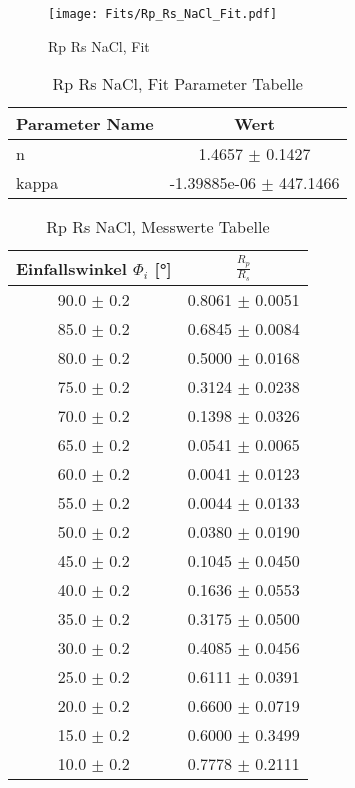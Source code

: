 \begin{figure}[ht] 
 	\centering 
 	\texttt{[image: Fits/Rp\_Rs\_NaCl\_Fit.pdf]} 
	\caption{Rp Rs NaCl, Fit} 
 	\label{fig:Rp Rs NaCl, Fit} 
\end{figure}
 
\begin{table}[ht] 
	\centering 
	\caption{Rp Rs NaCl, Fit Parameter Tabelle} 
	\label{tab: Rp Rs NaCl, Fit Parameter Tabelle}
	\begin{tabular}{|l|c|}
		\hline
		Parameter Name	&	Wert \\ \hline
		n	&	 1.4657 $\pm$  0.1427\\ \hline
		kappa	&	-1.39885e-06 $\pm$  447.1466\\ \hline
	\end{tabular} 
\end{table}
 
\begin{table}[ht] 
	\centering 
	\caption{Rp Rs NaCl, Messwerte Tabelle} 
	\label{tab: Rp Rs NaCl, Messwerte Tabelle}
	\begin{tabular}{|c|c|}
		\hline
		Einfallswinkel $\Phi_i$ [°] 	&	 $\frac{R_p}{R_s}$\\ \hline
		90.0 $\pm$ 0.2 	&	 0.8061 $\pm$ 0.0051 \\ \hline
		85.0 $\pm$ 0.2 	&	 0.6845 $\pm$ 0.0084 \\ \hline
		80.0 $\pm$ 0.2 	&	 0.5000 $\pm$ 0.0168 \\ \hline
		75.0 $\pm$ 0.2 	&	 0.3124 $\pm$ 0.0238 \\ \hline
		70.0 $\pm$ 0.2 	&	 0.1398 $\pm$ 0.0326 \\ \hline
		65.0 $\pm$ 0.2 	&	 0.0541 $\pm$ 0.0065 \\ \hline
		60.0 $\pm$ 0.2 	&	 0.0041 $\pm$ 0.0123 \\ \hline
		55.0 $\pm$ 0.2 	&	 0.0044 $\pm$ 0.0133 \\ \hline
		50.0 $\pm$ 0.2 	&	 0.0380 $\pm$ 0.0190 \\ \hline
		45.0 $\pm$ 0.2 	&	 0.1045 $\pm$ 0.0450 \\ \hline
		40.0 $\pm$ 0.2 	&	 0.1636 $\pm$ 0.0553 \\ \hline
		35.0 $\pm$ 0.2 	&	 0.3175 $\pm$ 0.0500 \\ \hline
		30.0 $\pm$ 0.2 	&	 0.4085 $\pm$ 0.0456 \\ \hline
		25.0 $\pm$ 0.2 	&	 0.6111 $\pm$ 0.0391 \\ \hline
		20.0 $\pm$ 0.2 	&	 0.6600 $\pm$ 0.0719 \\ \hline
		15.0 $\pm$ 0.2 	&	 0.6000 $\pm$ 0.3499 \\ \hline
		10.0 $\pm$ 0.2 	&	 0.7778 $\pm$ 0.2111 \\ \hline
	\end{tabular} 
\end{table}
 
